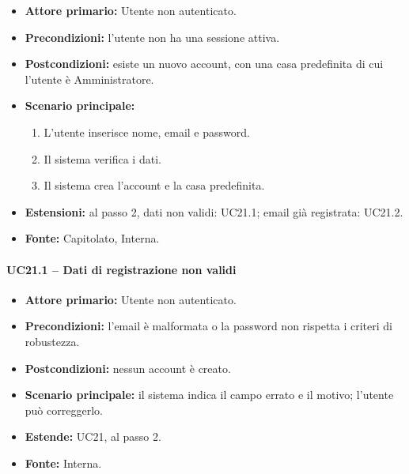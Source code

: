 \documentclass[12pt,a4paper]{article}
\newcommand{\tightlist}{\setlength{\itemsep}{1pt}\setlength{\parskip}{0pt}}
\begin{document}
\begin{itemize}

\tightlist

\item \textbf{Attore primario:} Utente non autenticato.

\item \textbf{Precondizioni:} l'utente non ha una sessione attiva.

\item \textbf{Postcondizioni:} esiste un nuovo account, con una casa predefinita di cui l'utente è Amministratore.

\item \textbf{Scenario principale:}

\begin{enumerate}

\tightlist

\item L'utente inserisce nome, email e password.

\item Il sistema verifica i dati.

\item Il sistema crea l'account e la casa predefinita.

\end{enumerate}

\item \textbf{Estensioni:} al passo 2, dati non validi: UC21.1; email già registrata: UC21.2.

\item \textbf{Fonte:} Capitolato, Interna.

\end{itemize}



\paragraph{UC21.1 -- Dati di registrazione non validi}

\begin{itemize}

\tightlist

\item \textbf{Attore primario:} Utente non autenticato.

\item \textbf{Precondizioni:} l'email è malformata o la password non rispetta i criteri di robustezza.

\item \textbf{Postcondizioni:} nessun account è creato.

\item \textbf{Scenario principale:} il sistema indica il campo errato e il motivo; l'utente può correggerlo.

\item \textbf{Estende:} UC21, al passo 2.

\item \textbf{Fonte:} Interna.

\end{itemize}
\end{document}
